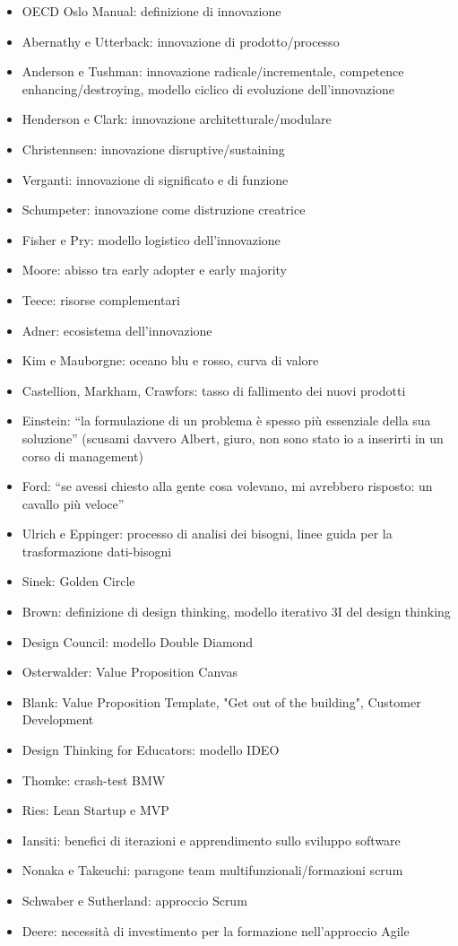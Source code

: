 \documentclass[answers, a4paper, 11pt]{exam}
\begin{document}
\begin{itemize}
    \item OECD Oslo Manual: definizione di innovazione
    \item Abernathy e Utterback: innovazione di prodotto/processo
    \item Anderson e Tushman: innovazione radicale/incrementale, competence enhancing/destroying, modello ciclico di evoluzione dell'innovazione
    \item Henderson e Clark: innovazione architetturale/modulare
    \item Christennsen: innovazione disruptive/sustaining
    \item Verganti: innovazione di significato e di funzione
    \item Schumpeter: innovazione come distruzione creatrice
    \item Fisher e Pry: modello logistico dell'innovazione
    \item Moore: abisso tra early adopter e early majority
    \item Teece: risorse complementari
    \item Adner: ecosistema dell'innovazione
    \item Kim e Mauborgne: oceano blu e rosso, curva di valore
    \item Castellion, Markham, Crawfors: tasso di fallimento dei nuovi prodotti
    \item Einstein: ``la formulazione di un problema è spesso più essenziale della sua soluzione'' (scusami davvero Albert, giuro, non sono stato io a inserirti in un corso di management)
    \item Ford: ``se avessi chiesto alla gente cosa volevano, mi avrebbero risposto: un cavallo più veloce''
    \item Ulrich e Eppinger: processo di analisi dei bisogni, linee guida per la trasformazione dati-bisogni
    \item Sinek: Golden Circle
    \item Brown: definizione di design thinking, modello iterativo 3I del design thinking
    \item Design Council: modello Double Diamond
    \item Osterwalder: Value Proposition Canvas
    \item Blank: Value Proposition Template, "Get out of the building", Customer Development
    \item Design Thinking for Educators: modello IDEO
    \item Thomke: crash-test BMW
    \item Ries: Lean Startup e MVP
    \item Iansiti: benefici di iterazioni e apprendimento sullo sviluppo software
    \item Nonaka e Takeuchi: paragone team multifunzionali/formazioni scrum
    \item Schwaber e Sutherland: approccio Scrum
    \item Deere: necessità di investimento per la formazione nell'approccio Agile
\end{itemize}
\end{document}
